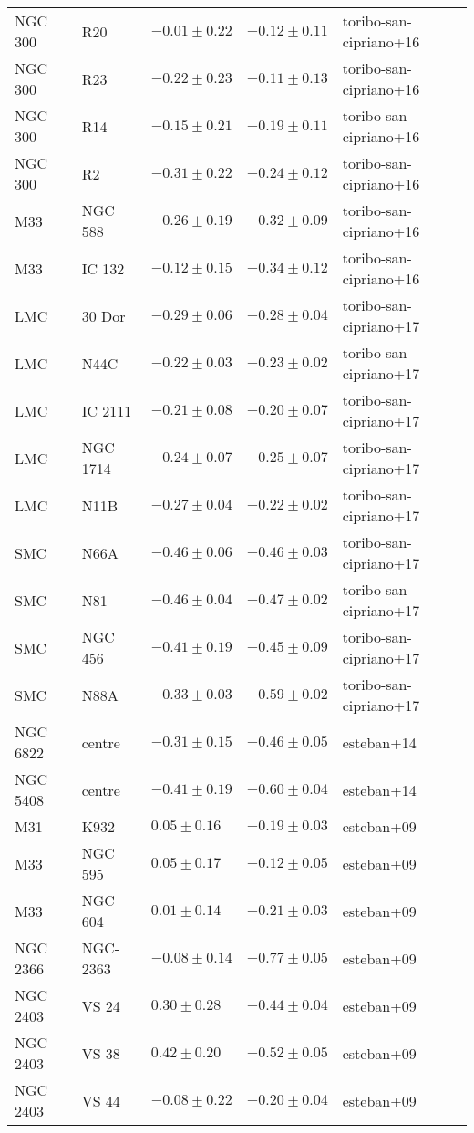 \documentclass[11pt]{article}
\begin{document}
\begin{table}
\begin{longtable}{lllll}
    NGC 300 & R20 & $-0.01 \pm 0.22$ & $-0.12 \pm 0.11$ & toribo-san-cipriano+16 \\
    NGC 300 & R23 & $-0.22 \pm 0.23$ & $-0.11 \pm 0.13$ & toribo-san-cipriano+16 \\
    NGC 300 & R14 & $-0.15 \pm 0.21$ & $-0.19 \pm 0.11$ & toribo-san-cipriano+16 \\
    NGC 300 & R2 & $-0.31 \pm 0.22$ & $-0.24 \pm 0.12$ & toribo-san-cipriano+16 \\
    M33 & NGC 588 & $-0.26 \pm 0.19$ & $-0.32 \pm 0.09$ & toribo-san-cipriano+16 \\
    M33 & IC 132 & $-0.12 \pm 0.15$ & $-0.34 \pm 0.12$ & toribo-san-cipriano+16 \\
    LMC & 30 Dor & $-0.29 \pm 0.06$ & $-0.28 \pm 0.04$ & toribo-san-cipriano+17 \\
    LMC & N44C & $-0.22 \pm 0.03$ & $-0.23 \pm 0.02$ & toribo-san-cipriano+17 \\
    LMC & IC 2111 & $-0.21 \pm 0.08$ & $-0.20 \pm 0.07$ & toribo-san-cipriano+17 \\
    LMC & NGC 1714 & $-0.24 \pm 0.07$ & $-0.25 \pm 0.07$ & toribo-san-cipriano+17 \\
    LMC & N11B & $-0.27 \pm 0.04$ & $-0.22 \pm 0.02$ & toribo-san-cipriano+17 \\
    SMC & N66A & $-0.46 \pm 0.06$ & $-0.46 \pm 0.03$ & toribo-san-cipriano+17 \\
    SMC & N81 & $-0.46 \pm 0.04$ & $-0.47 \pm 0.02$ & toribo-san-cipriano+17 \\
    SMC & NGC 456 & $-0.41 \pm 0.19$ & $-0.45 \pm 0.09$ & toribo-san-cipriano+17 \\
    SMC & N88A & $-0.33 \pm 0.03$ & $-0.59 \pm 0.02$ & toribo-san-cipriano+17 \\
    NGC 6822 & centre & $-0.31 \pm 0.15$ & $-0.46 \pm 0.05$ & esteban+14 \\
    NGC 5408 & centre & $-0.41 \pm 0.19$ & $-0.60 \pm 0.04$ & esteban+14 \\
    M31 & K932 & $0.05 \pm 0.16$ & $-0.19 \pm 0.03$ & esteban+09 \\
    M33 & NGC 595 & $0.05 \pm 0.17$ & $-0.12 \pm 0.05$ & esteban+09 \\
    M33 & NGC 604 & $0.01 \pm 0.14$ & $-0.21 \pm 0.03$ & esteban+09 \\
    NGC 2366 & NGC-2363 & $-0.08 \pm 0.14$ & $-0.77 \pm 0.05$ & esteban+09 \\
    NGC 2403 & VS 24 & $0.30 \pm 0.28$ & $-0.44 \pm 0.04$ & esteban+09 \\
    NGC 2403 & VS 38 & $0.42 \pm 0.20$ & $-0.52 \pm 0.05$ & esteban+09 \\
    NGC 2403 & VS 44 & $-0.08 \pm 0.22$ & $-0.20 \pm 0.04$ & esteban+09 \\

    \hline
    \end{longtable}


\end{table}
\end{document}
